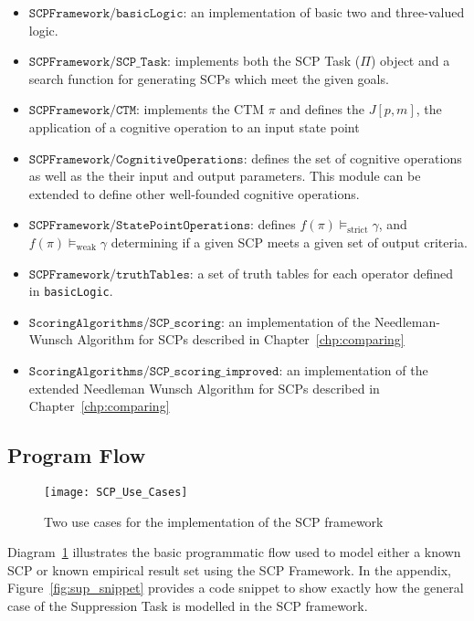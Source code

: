 \begin{itemize}
\item $\texttt{SCPFramework/basicLogic}$: an implementation of basic two and three-valued logic.
\item $\texttt{SCPFramework/SCP\_Task}$: implements both the SCP Task ($\Pi$) object and a search function for generating SCPs which meet the given goals.
\item $\texttt{SCPFramework/CTM}$: implements the CTM $\pi$ and defines the $J[p,m]$, the application of a cognitive operation to an input state point
\item $\texttt{SCPFramework/CognitiveOperations}$: defines the set of cognitive operations as well as the their input and output parameters. This module can be extended to define other well-founded cognitive operations.
\item $\texttt{SCPFramework/StatePointOperations}$: defines $f(\pi) \models_\text{strict} \gamma$, and $f(\pi) \models_\text{weak} \gamma$ determining if a given SCP meets a given set of output criteria.
\item $\texttt{SCPFramework/truthTables}$: a set of truth tables for each operator defined in \texttt{basicLogic}.
\item $\texttt{ScoringAlgorithms/SCP\_scoring}$: an implementation of the Needleman-Wunsch Algorithm for SCPs described in Chapter~\ref{chp:comparing}
\item $\texttt{ScoringAlgorithms/SCP\_scoring\_improved}$: an implementation of the extended Needleman Wunsch Algorithm for SCPs described in Chapter~\ref{chp:comparing}
\end{itemize}

\subsection{Program Flow}
\begin{figure}
\centering \texttt{[image: SCP\_Use\_Cases]}
\caption{Two use cases for the implementation of the SCP framework}
\label{fig:SCP_Use_Cases}
\end{figure}



Diagram~\ref{fig:SCP_Use_Cases} illustrates the basic programmatic flow used to model either a known SCP or known empirical result set using the SCP Framework. In the appendix, Figure~\ref{fig:sup_snippet} provides a code snippet to show exactly how the general case of the Suppression Task is modelled in the SCP framework.




